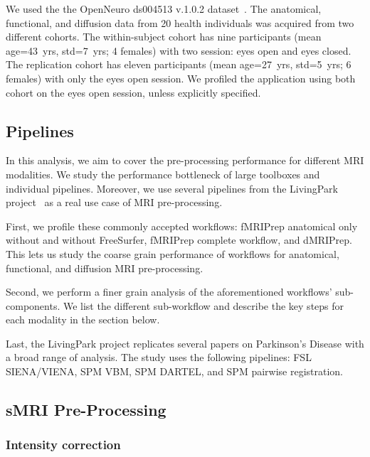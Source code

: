 \documentclass[conference]{IEEEtran}
\begin{document}
We used the the OpenNeuro ds004513 v.1.0.2 dataset~\cite{ds004513:1.0.2}. The anatomical, functional, and diffusion data from 20 health individuals was acquired from two different cohorts. The within-subject cohort has nine participants (mean age=43~yrs, std=7~yrs; 4 females) with two session: eyes open and eyes closed. The replication cohort has eleven participants (mean age=27~yrs, std=5~yrs; 6 females) with only the eyes open session. We profiled the application using both cohort on the eyes open session, unless explicitly specified.

\subsection{Pipelines}
In this analysis, we aim to cover the pre-processing performance for different MRI modalities. We study the performance bottleneck of large toolboxes and individual pipelines. Moreover, we use several pipelines from the LivingPark project~\cite{livingpark} as a real use case of MRI pre-processing.

First, we profile these commonly accepted workflows: fMRIPrep anatomical only without and without FreeSurfer, fMRIPrep complete workflow, and dMRIPrep. This lets us study the coarse grain performance of workflows for anatomical, functional, and diffusion MRI pre-processing.

Second, we perform a finer grain analysis of the aforementioned workflows' sub-components. We list the different sub-workflow and describe the key steps for each modality in the section below.

Last, the LivingPark project replicates several papers on Parkinson's Disease with a broad range of analysis. The study uses the following pipelines: FSL SIENA/VIENA, SPM VBM, SPM DARTEL, and SPM pairwise registration.

\subsection{sMRI Pre-Processing}
\subsubsection{Intensity correction}
\end{document}
